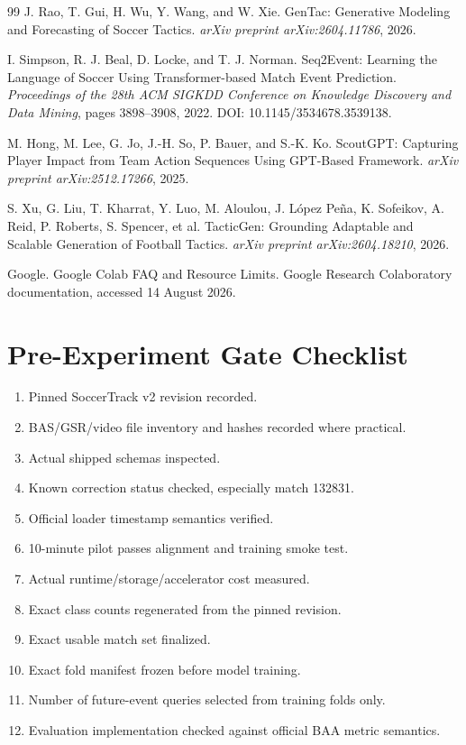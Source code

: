 \documentclass[11pt,a4paper]{article}
\begin{document}
\begin{thebibliography}{99}
J. Rao, T. Gui, H. Wu, Y. Wang, and W. Xie.
\newblock GenTac: Generative Modeling and Forecasting of Soccer Tactics.
\newblock \emph{arXiv preprint arXiv:2604.11786}, 2026.

I. Simpson, R. J. Beal, D. Locke, and T. J. Norman.
\newblock Seq2Event: Learning the Language of Soccer Using Transformer-based Match Event Prediction.
\newblock \emph{Proceedings of the 28th ACM SIGKDD Conference on Knowledge Discovery and Data Mining}, pages 3898--3908, 2022. DOI: 10.1145/3534678.3539138.

M. Hong, M. Lee, G. Jo, J.-H. So, P. Bauer, and S.-K. Ko.
\newblock ScoutGPT: Capturing Player Impact from Team Action Sequences Using GPT-Based Framework.
\newblock \emph{arXiv preprint arXiv:2512.17266}, 2025.

S. Xu, G. Liu, T. Kharrat, Y. Luo, M. Aloulou, J. López Peña, K. Sofeikov, A. Reid, P. Roberts, S. Spencer, et al.
\newblock TacticGen: Grounding Adaptable and Scalable Generation of Football Tactics.
\newblock \emph{arXiv preprint arXiv:2604.18210}, 2026.

Google.
\newblock Google Colab FAQ and Resource Limits.
\newblock Google Research Colaboratory documentation, accessed 14 August 2026.

\end{thebibliography}

\appendix
\section{Pre-Experiment Gate Checklist}
\begin{enumerate}
  \item Pinned SoccerTrack v2 revision recorded.
  \item BAS/GSR/video file inventory and hashes recorded where practical.
  \item Actual shipped schemas inspected.
  \item Known correction status checked, especially match 132831.
  \item Official loader timestamp semantics verified.
  \item 10-minute pilot passes alignment and training smoke test.
  \item Actual runtime/storage/accelerator cost measured.
  \item Exact class counts regenerated from the pinned revision.
  \item Exact usable match set finalized.
  \item Exact fold manifest frozen before model training.
  \item Number of future-event queries selected from training folds only.
  \item Evaluation implementation checked against official BAA metric semantics.
\end{enumerate}
\end{document}
